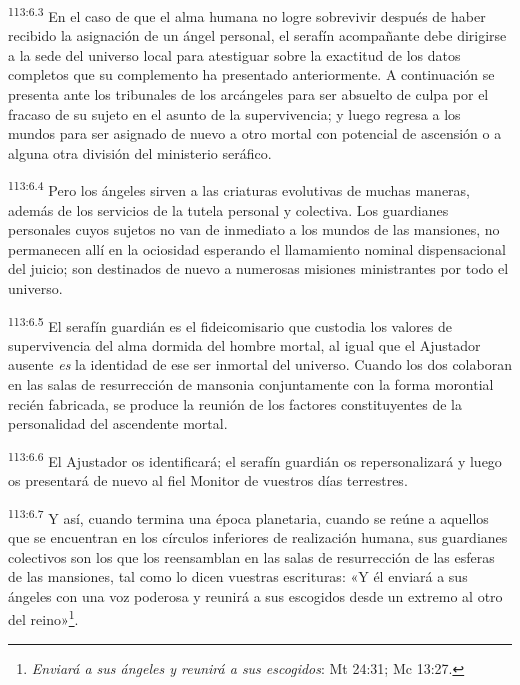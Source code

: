 \par
\textsuperscript{113:6.3} En el caso de que el alma humana no logre sobrevivir después de haber recibido la asignación de un ángel personal, el serafín acompañante debe dirigirse a la sede del universo local para atestiguar sobre la exactitud de los datos completos que su complemento ha presentado anteriormente. A continuación se presenta ante los tribunales de los arcángeles para ser absuelto de culpa por el fracaso de su sujeto en el asunto de la supervivencia; y luego regresa a los mundos para ser asignado de nuevo a otro mortal con potencial de ascensión o a alguna otra división del ministerio seráfico.

\par
\textsuperscript{113:6.4} Pero los ángeles sirven a las criaturas evolutivas de muchas maneras, además de los servicios de la tutela personal y colectiva. Los guardianes personales cuyos sujetos no van de inmediato a los mundos de las mansiones, no permanecen allí en la ociosidad esperando el llamamiento nominal dispensacional del juicio; son destinados de nuevo a numerosas misiones ministrantes por todo el universo.

\par
\textsuperscript{113:6.5} El serafín guardián es el fideicomisario que custodia los valores de supervivencia del alma dormida del hombre mortal, al igual que el Ajustador ausente \textit{es} la identidad de ese ser inmortal del universo. Cuando los dos colaboran en las salas de resurrección de mansonia conjuntamente con la forma morontial recién fabricada, se produce la reunión de los factores constituyentes de la personalidad del ascendente mortal.

\par
\textsuperscript{113:6.6} El Ajustador os identificará; el serafín guardián os repersonalizará y luego os presentará de nuevo al fiel Monitor de vuestros días terrestres.

\par
\textsuperscript{113:6.7} Y así, cuando termina una época planetaria, cuando se reúne a aquellos que se encuentran en los círculos inferiores de realización humana, sus guardianes colectivos son los que los reensamblan en las salas de resurrección de las esferas de las mansiones, tal como lo dicen vuestras escrituras: «Y él enviará a sus ángeles con una voz poderosa y reunirá a sus escogidos desde un extremo al otro del reino»\footnote{\textit{Enviará a sus ángeles y reunirá a sus escogidos}: Mt 24:31; Mc 13:27.}.

